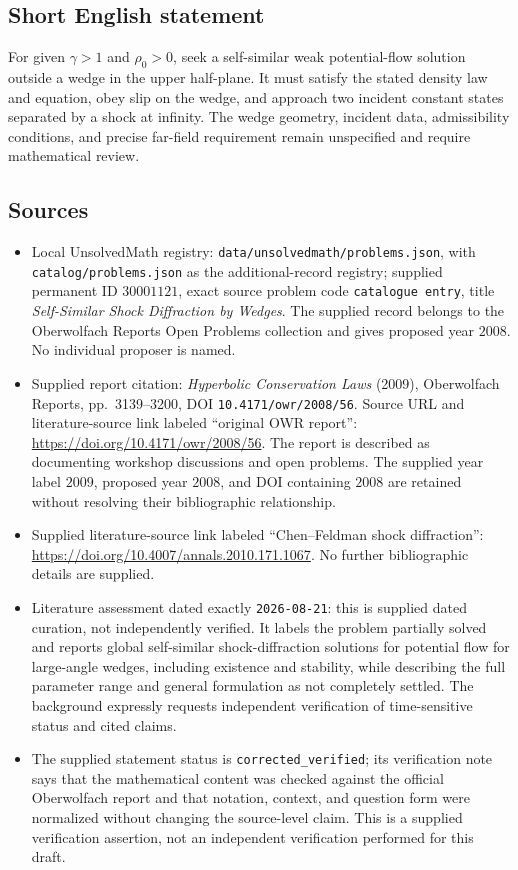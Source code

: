 \documentclass[11pt]{article}
\begin{document}
\subsection{Short English statement}
For given \(\gamma>1\) and \(\rho_0>0\), seek a self-similar weak potential-flow solution outside a wedge in the upper half-plane. It must satisfy the stated density law and equation, obey slip on the wedge, and approach two incident constant states separated by a shock at infinity. The wedge geometry, incident data, admissibility conditions, and precise far-field requirement remain unspecified and require mathematical review.
\subsection{Sources}
\begin{itemize}
\item Local UnsolvedMath registry: \texttt{data/unsolvedmath/problems.json}, with \texttt{catalog/problems.json} as the additional-record registry; supplied permanent ID \(30001121\), exact source problem code \texttt{catalogue entry}, title \emph{Self-Similar Shock Diffraction by Wedges}. The supplied record belongs to the Oberwolfach Reports Open Problems collection and gives proposed year \(2008\). No individual proposer is named.
\item Supplied report citation: \emph{Hyperbolic Conservation Laws} (2009), Oberwolfach Reports, pp.\ 3139--3200, DOI \texttt{10.4171/owr/2008/56}. Source URL and literature-source link labeled ``original OWR report'': \url{https://doi.org/10.4171/owr/2008/56}. The report is described as documenting workshop discussions and open problems. The supplied year label \(2009\), proposed year \(2008\), and DOI containing \(2008\) are retained without resolving their bibliographic relationship.
\item Supplied literature-source link labeled ``Chen--Feldman shock diffraction'': \url{https://doi.org/10.4007/annals.2010.171.1067}. No further bibliographic details are supplied.
\item Literature assessment dated exactly \texttt{2026-08-21}: this is supplied dated curation, not independently verified. It labels the problem partially solved and reports global self-similar shock-diffraction solutions for potential flow for large-angle wedges, including existence and stability, while describing the full parameter range and general formulation as not completely settled. The background expressly requests independent verification of time-sensitive status and cited claims.
\item The supplied statement status is \texttt{corrected\_verified}; its verification note says that the mathematical content was checked against the official Oberwolfach report and that notation, context, and question form were normalized without changing the source-level claim. This is a supplied verification assertion, not an independent verification performed for this draft.
\end{itemize}
\end{document}
